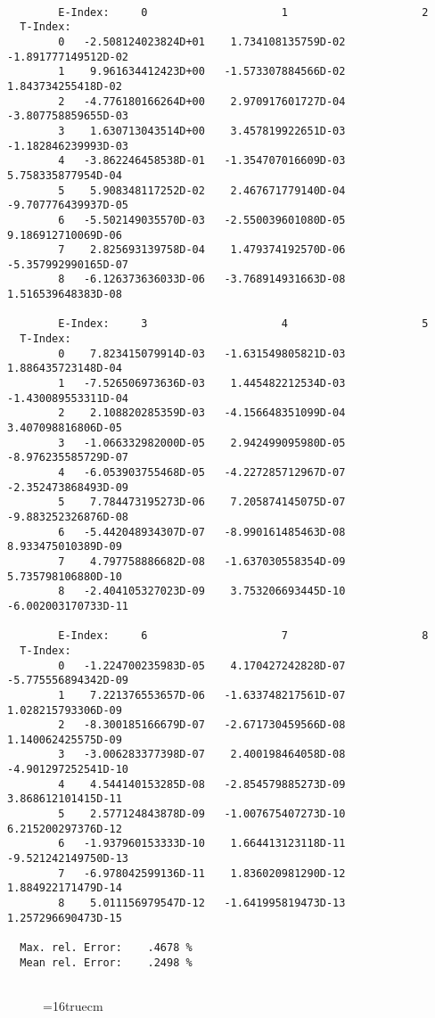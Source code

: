 \documentclass[12pt]{article}
\begin{document}
\begin{small}\begin{verbatim}

        E-Index:     0                     1                     2
  T-Index:
        0   -2.508124023824D+01    1.734108135759D-02   -1.891777149512D-02
        1    9.961634412423D+00   -1.573307884566D-02    1.843734255418D-02
        2   -4.776180166264D+00    2.970917601727D-04   -3.807758859655D-03
        3    1.630713043514D+00    3.457819922651D-03   -1.182846239993D-03
        4   -3.862246458538D-01   -1.354707016609D-03    5.758335877954D-04
        5    5.908348117252D-02    2.467671779140D-04   -9.707776439937D-05
        6   -5.502149035570D-03   -2.550039601080D-05    9.186912710069D-06
        7    2.825693139758D-04    1.479374192570D-06   -5.357992990165D-07
        8   -6.126373636033D-06   -3.768914931663D-08    1.516539648383D-08

        E-Index:     3                     4                     5
  T-Index:
        0    7.823415079914D-03   -1.631549805821D-03    1.886435723148D-04
        1   -7.526506973636D-03    1.445482212534D-03   -1.430089553311D-04
        2    2.108820285359D-03   -4.156648351099D-04    3.407098816806D-05
        3   -1.066332982000D-05    2.942499095980D-05   -8.976235585729D-07
        4   -6.053903755468D-05   -4.227285712967D-07   -2.352473868493D-09
        5    7.784473195273D-06    7.205874145075D-07   -9.883252326876D-08
        6   -5.442048934307D-07   -8.990161485463D-08    8.933475010389D-09
        7    4.797758886682D-08   -1.637030558354D-09    5.735798106880D-10
        8   -2.404105327023D-09    3.753206693445D-10   -6.002003170733D-11

        E-Index:     6                     7                     8
  T-Index:
        0   -1.224700235983D-05    4.170427242828D-07   -5.775556894342D-09
        1    7.221376553657D-06   -1.633748217561D-07    1.028215793306D-09
        2   -8.300185166679D-07   -2.671730459566D-08    1.140062425575D-09
        3   -3.006283377398D-07    2.400198464058D-08   -4.901297252541D-10
        4    4.544140153285D-08   -2.854579885273D-09    3.868612101415D-11
        5    2.577124843878D-09   -1.007675407273D-10    6.215200297376D-12
        6   -1.937960153333D-10    1.664413123118D-11   -9.521242149750D-13
        7   -6.978042599136D-11    1.836020981290D-12    1.884922171479D-14
        8    5.011156979547D-12   -1.641995819473D-13    1.257296690473D-15

  Max. rel. Error:    .4678 %
  Mean rel. Error:    .2498 %


\end{verbatim}\end{small}
\begin{figure} \label{2.1.5i}
\epsfxsize=16truecm
\end{figure}
\newpage
\end{document}
